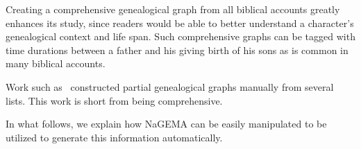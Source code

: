 \documentclass{llncs}
\begin{document}
Creating a comprehensive genealogical graph from all biblical accounts greatly enhances its study,
since readers would be able to better understand a character's genealogical context and life span. Such comprehensive graphs can be tagged
with time durations between a father and his giving birth of his sons as is common in many biblical accounts. 

Work such as~\cite{Belote:Online,SoulLiberty:Online} constructed partial genealogical graphs manually from several lists.
This work is short from being comprehensive. 

In what follows, we explain how NaGEMA can be easily manipulated to be utilized 
to generate this information automatically.





\end{document}
